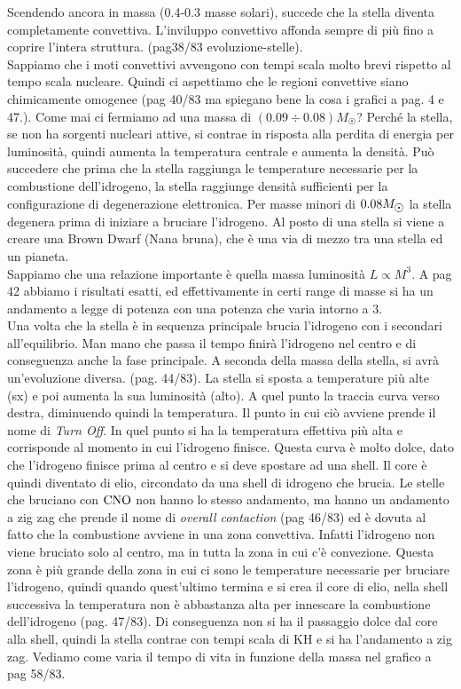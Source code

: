 Scendendo ancora in massa (0.4-0.3 masse solari), succede che la stella diventa completamente convettiva. L'inviluppo convettivo affonda sempre di più fino a coprire l'intera struttura. (pag38/83 evoluzione-stelle). \\
Sappiamo che i moti convettivi avvengono con tempi scala molto brevi rispetto al tempo scala nucleare. Quindi ci aspettiamo che le regioni convettive siano chimicamente omogenee (pag 40/83 ma spiegano bene la cosa i grafici a pag. 4 e 47.). Come mai ci fermiamo ad una massa di $(0.09\div0.08)M_{\astrosun}$? Perché la stella, se non ha sorgenti nucleari attive, si contrae in risposta alla perdita di energia per luminosità, quindi aumenta la temperatura centrale e aumenta la densità. Può succedere che prima che la stella raggiunga le temperature necessarie per la combustione dell'idrogeno, la stella raggiunge densità sufficienti per la configurazione di degenerazione elettronica. Per masse minori di $0.08\sunmass$ la stella degenera prima di iniziare a bruciare l'idrogeno. Al posto di una stella si viene a creare una Brown Dwarf (Nana bruna), che è una via di mezzo tra una stella ed un pianeta.\\
Sappiamo che una relazione importante è quella massa luminosità $L\propto M^3$. A pag 42 abbiamo i risultati esatti, ed effettivamente in certi range di masse si ha un andamento a legge di potenza con una potenza che varia intorno a 3.\\
Una volta che la stella è in sequenza principale brucia l'idrogeno con i secondari all'equilibrio. Man mano che passa il tempo finirà l'idrogeno nel centro e di conseguenza anche la fase principale. A seconda della massa della stella, si avrà un'evoluzione diversa. (pag. 44/83). La stella si sposta a temperature più alte (sx) e poi aumenta la sua luminosità (alto). A quel punto la traccia curva verso destra, diminuendo quindi la temperatura. Il punto in cui ciò avviene prende il nome di \textit{Turn Off}. In quel punto si ha la temperatura effettiva più alta e corrisponde al momento in cui l'idrogeno finisce. Questa curva è molto dolce, dato che l'idrogeno finisce prima al centro e si deve spostare ad una shell. Il core è quindi diventato di elio, circondato da una shell di idrogeno che brucia. Le stelle che bruciano con $\ce{CNO}$ non hanno lo stesso andamento, ma hanno un andamento a zig zag che prende il nome di \textit{overall contaction} (pag 46/83) ed è dovuta al fatto che la combustione avviene in una zona convettiva. Infatti l'idrogeno non viene bruciato solo al centro, ma in tutta la zona in cui c'è convezione. Questa zona è più grande della zona in cui ci sono le temperature necessarie per bruciare l'idrogeno, quindi quando quest'ultimo termina e si crea il core di elio, nella shell successiva la temperatura non è abbastanza alta per innescare la combustione dell'idrogeno (pag. 47/83). Di conseguenza non si ha il passaggio dolce dal core alla shell, quindi la stella contrae con tempi scala di KH e si ha l'andamento a zig zag. Vediamo come varia il tempo di vita in funzione della massa nel grafico a pag 58/83. \\
